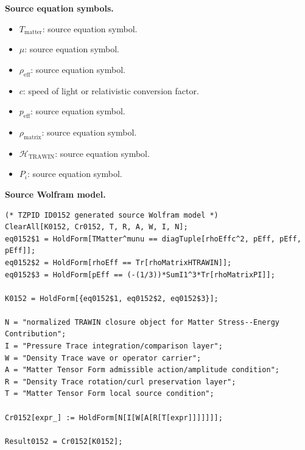 \begin{minipage}[t]{0.49\linewidth}
\begingroup
\small
\raggedright
\textbf{Source equation symbols.}\par
\begin{itemize}[leftmargin=1.35em,itemsep=1pt,topsep=1pt,parsep=0pt]
    \item $T_{\mathrm{matter}}$: source equation symbol.
    \item $\mu$: source equation symbol.
    \item $\rho_{\mathrm{eff}}$: source equation symbol.
    \item $c$: speed of light or relativistic conversion factor.
    \item $p_{\mathrm{eff}}$: source equation symbol.
    \item $\rho_{\mathrm{matrix}}$: source equation symbol.
    \item $\mathcal{H}_{\mathrm{TRAWIN}}$: source equation symbol.
    \item $P_i$: source equation symbol.
\end{itemize}
\endgroup
\end{minipage}\hfill
\begin{minipage}[t]{0.47\linewidth}
\begingroup
\scriptsize
\raggedright
\textbf{Source Wolfram model.}\par
\begin{Verbatim}[fontsize=\tiny,breaklines=true,breakanywhere=true]
(* TZPID ID0152 generated source Wolfram model *)
ClearAll[K0152, Cr0152, T, R, A, W, I, N];
eq0152$1 = HoldForm[TMatter^munu == diagTuple[rhoEffc^2, pEff, pEff, pEff]];
eq0152$2 = HoldForm[rhoEff == Tr[rhoMatrixHTRAWIN]];
eq0152$3 = HoldForm[pEff == (-(1/3))*SumI1^3*Tr[rhoMatrixPI]];

K0152 = HoldForm[{eq0152$1, eq0152$2, eq0152$3}];

N = "normalized TRAWIN closure object for Matter Stress--Energy Contribution";
I = "Pressure Trace integration/comparison layer";
W = "Density Trace wave or operator carrier";
A = "Matter Tensor Form admissible action/amplitude condition";
R = "Density Trace rotation/curl preservation layer";
T = "Matter Tensor Form local source condition";

Cr0152[expr_] := HoldForm[N[I[W[A[R[T[expr]]]]]]];

Result0152 = Cr0152[K0152];
\end{Verbatim}
\endgroup
\end{minipage}

